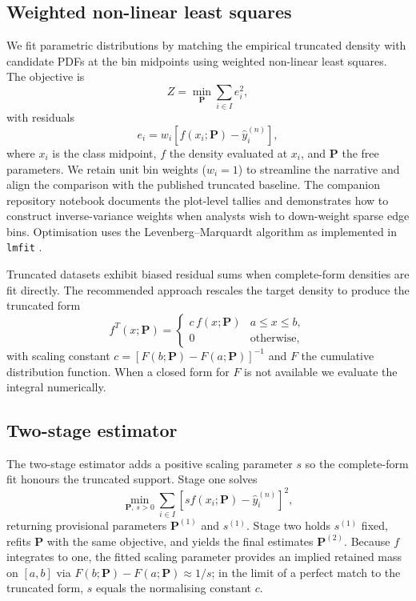 \documentclass[12pt]{article}
\begin{document}
\subsection{Weighted non-linear least squares}
\label{sec:methods_nlls}

We fit parametric distributions by matching the empirical truncated density with candidate PDFs at the bin midpoints using weighted non-linear least squares. The objective is
\begin{equation}
  Z = \min_{\bm{P}} \sum_{i \in I} e_i^2,
\end{equation}
with residuals
\begin{equation}
  e_i = w_i \left[f(x_i; \bm{P}) - \hat{y}_i^{(n)}\right],
\end{equation}
where $x_i$ is the class midpoint, $f$ the density evaluated at $x_i$, and $\bm{P}$ the free parameters. We retain unit bin weights ($w_i = 1$) to streamline the narrative and align the comparison with the published truncated baseline. The companion repository notebook documents the plot-level tallies and demonstrates how to construct inverse-variance weights when analysts wish to down-weight sparse edge bins.
Optimisation uses the Levenberg--Marquardt algorithm as implemented in \texttt{lmfit} \citep{levenberg1944method, marquardt1963algorithm}.

Truncated datasets exhibit biased residual sums when complete-form densities are fit directly. The recommended approach rescales the target density to produce the truncated form
\begin{equation}
  f^{T}(x; \bm{P}) =
    \begin{cases}
      c\, f(x; \bm{P}) & a \leq x \leq b, \\
      0 & \text{otherwise},
    \end{cases}
\end{equation}
with scaling constant $c = [F(b; \bm{P}) - F(a; \bm{P})]^{-1}$ and $F$ the cumulative distribution function. When a closed form for $F$ is not available we evaluate the integral numerically.

\subsection{Two-stage estimator}
\label{sec:methods_twostage}

The two-stage estimator adds a positive scaling parameter $s$ so the complete-form fit honours the truncated support. Stage one solves
\begin{equation}
  \min_{\bm{P},\, s>0} \sum_{i \in I} \left[s f(x_i; \bm{P}) - \hat{y}_i^{(n)}\right]^2,
\end{equation}
returning provisional parameters $\bm{P}^{(1)}$ and $s^{(1)}$. Stage two holds $s^{(1)}$ fixed, refits $\bm{P}$ with the same objective, and yields the final estimates $\bm{P}^{(2)}$.
Because $f$ integrates to one, the fitted scaling parameter provides an implied retained mass on $[a,b]$ via $F(b;\bm{P})-F(a;\bm{P}) \approx 1/s$; in the limit of a perfect match to the truncated form, $s$ equals the normalising constant $c$.
\end{document}
